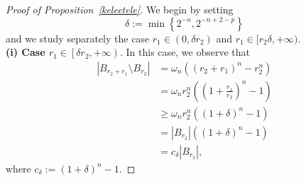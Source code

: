 \documentclass[12pt]{article}
\numberwithin{equation}{section}
\renewcommand{\geq}{\geqslant}
\begin{document}
\begin{proof}[Proof of Proposition~\ref{keleetele}]
We begin by setting 
$$\delta:=\min\left\lbrace 2^{-n}, 2^{-n+2-p} \right\rbrace$$ 
and we study separately the case $r_1\in (0,\delta r_2)$ and $r_1\in [r_2\delta,+\infty)$.\\
\medskip
\textbf{(i) Case $r_1\in\left[\delta r_2,+\infty\right)$}. In this case, we observe that    
\begin{equation}\label{tbeczhntb6}
\begin{split}
\left|B_{r_2+r_1}\setminus B_{r_2}\right|&=\omega_n\left((r_2+r_1)^n-r_2^n\right)\\
&=\omega_n r_2^n \left(\left(1+\frac{r_1}{r_2}\right)^n-1\right)\\
&\geq \omega_n r_2^n \left(\left(1+\delta\right)^n-1\right)\\
&=\left|B_{r_2}\right|\left(\left(1+\delta\right)^n-1\right)\\
&=c_\delta\left|B_{r_2}\right|,
\end{split}
\end{equation}
where $c_\delta:=(1+\delta)^n-1$. 


\end{proof}
\end{document}
